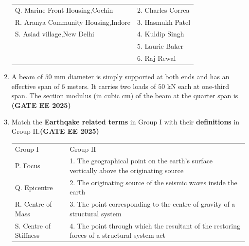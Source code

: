 \documentclass[journal,12pt,onecolumn]{IEEEtran}
\theoremstyle{remark}
\begin{document}
\begin{enumerate}
\begin{tabular}{p{}p{}}
  Q. Marine Front Housing,Cochin &2. Charles Correa\\
  R. Aranya Community Housing,Indore &3. Hasmukh Patel\\
  S. Asiad village,New Delhi &4. Kuldip Singh\\
     & 5. Laurie Baker\\
      &6. Raj Rewal\\
\end{tabular}
\begin{enumerate}
\end{enumerate}
\item A beam of $50$ mm diameter is simply supported at both ends and has an effective span of $6$ meters. It carries two loads of $50$ kN each at one-third span. The section modulus (in cubic cm) of the beam at the quarter span is \hfill \textbf{(GATE EE 2025)}
\begin{enumerate}
\end{enumerate}
\item Match the \textbf{Earthqake related terms} in Group I with their \textbf{definitions} in Group II.\hfill \textbf{(GATE EE 2025)}
\newline
\begin{tabular}{p{}p{}}
 Group I    & Group II \\
P. Focus     & 1. The geographical point on the earth's surface vertically above the originating source\\
Q. Epicentre & 2. The originating source of the seismic waves inside the earth\\
R. Centre of Mass & 3. The point corresponding to the centre of gravity of a structural system\\
S. Centre of Stiffness & 4. The point through which the resultant of the restoring forces of a structural system act\\
\end{tabular}
\begin{enumerate}
\end{enumerate}
  

\end{enumerate}
\end{document}
